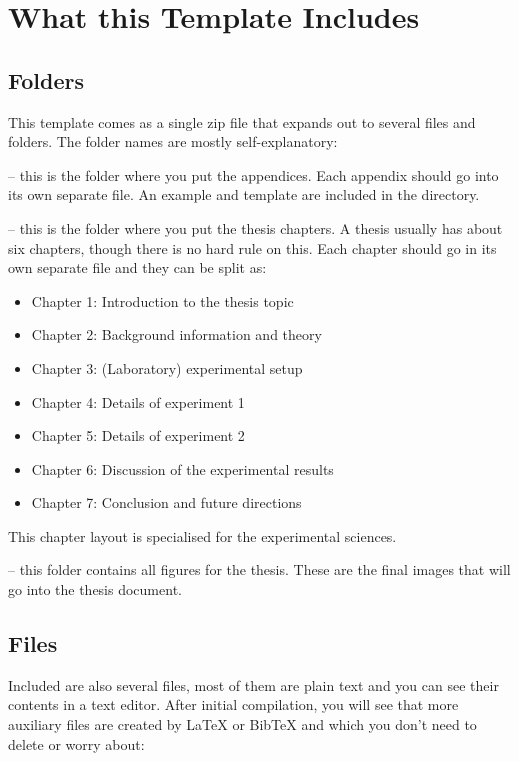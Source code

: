 
\section{What this Template Includes}

\subsection{Folders}

This template comes as a single zip file that expands out to several files and folders. The folder names are mostly self-explanatory:

 -- this is the folder where you put the appendices. Each appendix should go into its own separate  file. An example and template are included in the directory.

 -- this is the folder where you put the thesis chapters. A thesis usually has about six chapters, though there is no hard rule on this. Each chapter should go in its own separate  file and they can be split as:
\begin{itemize}
\item Chapter 1: Introduction to the thesis topic
\item Chapter 2: Background information and theory
\item Chapter 3: (Laboratory) experimental setup
\item Chapter 4: Details of experiment 1
\item Chapter 5: Details of experiment 2
\item Chapter 6: Discussion of the experimental results
\item Chapter 7: Conclusion and future directions
\end{itemize}
This chapter layout is specialised for the experimental sciences.

 -- this folder contains all figures for the thesis. These are the final images that will go into the thesis document.

\subsection{Files}

Included are also several files, most of them are plain text and you can see their contents in a text editor. After initial compilation, you will see that more auxiliary files are created by \LaTeX{} or BibTeX and which you don't need to delete or worry about:

